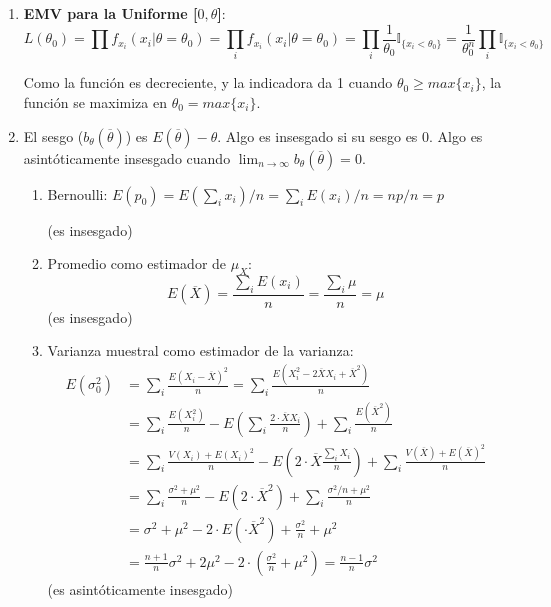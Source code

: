 \begin{enumerate}
	\item
		\textbf{EMV para la Uniforme [$0,\theta$]}:
		$$L(\theta_0) = \prod f_{x_i}(x_i|\theta = \theta_0)
			= \prod_i f_{x_i}(x_i|\theta = \theta_0)
			= \prod_i \frac{1}{\theta_0} \mathbb{I}_{\{x_i < \theta_0\}}
			= \frac{1}{\theta_0^n} \prod_i \mathbb{I}_{\{x_i < \theta_0\}}$$
			
		Como la función es decreciente, y la indicadora da 1 cuando $\theta_0 \geq max\{x_i\}$, la función se maximiza en $\theta_0 =  max\{x_i\}$.
		
	\item
		El sesgo ($b_{\theta}(\overline{\theta})$) es $E(\overline{\theta}) - \theta$.
		Algo es insesgado si su sesgo es 0. Algo es asintóticamente insesgado cuando $\lim_{n\rightarrow\infty}b_{\theta}(\overline{\theta}) = 0$.
		
		\begin{enumerate}
			\item Bernoulli: $E(p_0) = E(\sum_i x_i) / n = \sum_i E(x_i) / n = np/n = p$
			
			(es insesgado)
			\item Promedio como estimador de $\mu_X$:
				$$E(\overline{X}) = \frac{\sum_i E(x_i)}{n} = \frac{\sum_i \mu}{n} = \mu$$ (es insesgado)
			\item Varianza muestral como estimador de la varianza:
				\begin{align*}
					E(\sigma_0^2) 	& = \sum_i \frac{E(X_i - \overline{X})^2}{n} = \sum_i \frac{E(X_i^2 -2\overline{X}X_i + \overline{X}^2)}{n}												\\
									& = \sum_i \frac{E(X_i^2)}{n} - E\left(\sum_i\frac{2\cdot \overline{X}X_i}{n}\right) + \sum_i\frac{E(\overline{X}^2)}{n}								\\
									& = \sum_i \frac{V(X_i) + E(X_i)^2}{n} - E\left(2\cdot \overline{X}\frac{\sum_i X_i}{n}\right) + \sum_i\frac{V(\overline{X}) + E(\overline{X})^2}{n}	\\
									& = \sum_i \frac{\sigma^2 + \mu^2}{n} - E(2\cdot \overline{X}^2) + \sum_i\frac{\sigma^2/n + \mu^2}{n}													\\
									& = \sigma^2 + \mu^2 - 2\cdot E(\cdot \overline{X}^2) + \frac{\sigma^2}{n} + \mu^2																		\\
									& = \frac{n+1}{n}\sigma^2 + 2\mu^2 - 2\cdot \left(\frac{\sigma^2}{n} + \mu^2\right) = \frac{n-1}{n}\sigma^2
				\end{align*}
				(es asintóticamente insesgado)
		\end{enumerate}
		

\end{enumerate}
